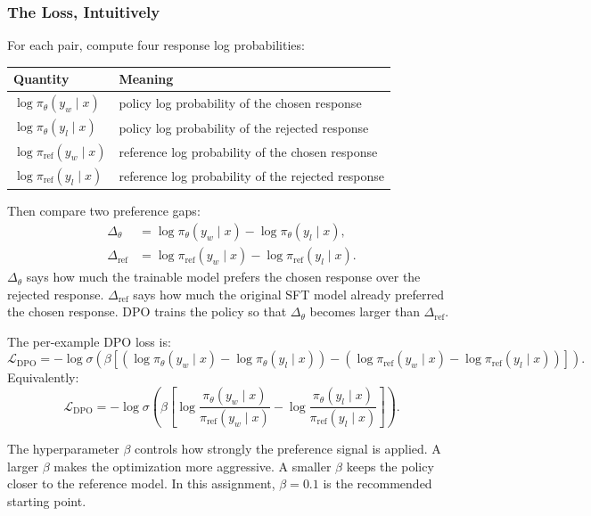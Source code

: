 \documentclass[11pt]{article}
\begin{document}
\subsubsection{The Loss, Intuitively}
For each pair, compute four response log probabilities:
\begin{center}
\begin{tabular}{ll}
\toprule
Quantity & Meaning \\
\midrule
$\log \pi_\theta(y_w \mid x)$ & policy log probability of the chosen response \\
$\log \pi_\theta(y_l \mid x)$ & policy log probability of the rejected response \\
$\log \pi_{\mathrm{ref}}(y_w \mid x)$ & reference log probability of the chosen response \\
$\log \pi_{\mathrm{ref}}(y_l \mid x)$ & reference log probability of the rejected response \\
\bottomrule
\end{tabular}
\end{center}

Then compare two preference gaps:
\begin{align}
  \Delta_\theta &= \log \pi_\theta(y_w \mid x) - \log \pi_\theta(y_l \mid x), \\
  \Delta_{\mathrm{ref}} &= \log \pi_{\mathrm{ref}}(y_w \mid x) - \log \pi_{\mathrm{ref}}(y_l \mid x).
\end{align}
$\Delta_\theta$ says how much the trainable model prefers the chosen response over the rejected response. $\Delta_{\mathrm{ref}}$ says how much the original SFT model already preferred the chosen response. DPO trains the policy so that $\Delta_\theta$ becomes larger than $\Delta_{\mathrm{ref}}$.

The per-example DPO loss is:
\begin{equation}
\mathcal{L}_{\text{DPO}}
= -\log \sigma \left(
\beta \left[
(\log \pi_\theta(y_w \mid x) - \log \pi_\theta(y_l \mid x))
-
(\log \pi_{\mathrm{ref}}(y_w \mid x) - \log \pi_{\mathrm{ref}}(y_l \mid x))
\right]
\right).
\end{equation}
Equivalently:
\begin{equation}
\mathcal{L}_{\text{DPO}}
= -\log \sigma \left(
\beta \left[
\log \frac{\pi_\theta(y_w \mid x)}{\pi_{\mathrm{ref}}(y_w \mid x)}
-
\log \frac{\pi_\theta(y_l \mid x)}{\pi_{\mathrm{ref}}(y_l \mid x)}
\right]
\right).
\end{equation}

The hyperparameter $\beta$ controls how strongly the preference signal is applied. A larger $\beta$ makes the optimization more aggressive. A smaller $\beta$ keeps the policy closer to the reference model. In this assignment, $\beta=0.1$ is the recommended starting point.
\end{document}
